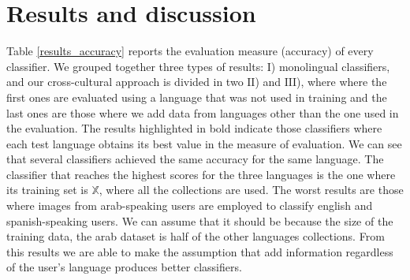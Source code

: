 \documentclass[runningheads]{llncs}
\begin{document}


\section{Results and discussion}\label{section:results}

Table \ref{results_accuracy} reports the evaluation measure (accuracy) 
of every classifier. We grouped together
three types of results: $\mathrm{I}$) monolingual classifiers,
and our cross-cultural approach is divided in two $\mathrm{II}$) and
$\mathrm{III}$), where where the first ones are evaluated using a language that was not used in training and the last ones are those where we add data from
languages other than the one used in the evaluation.
The results highlighted in bold indicate those classifiers where 
each test language obtains its best value in the measure of evaluation.
We can see that several classifiers achieved the same accuracy
for the same language. The classifier that reaches the highest scores 
for the three languages is the one where its training set is $\mathbb{X}$,
where all the collections are used.
The worst results are those where images from arab-speaking users
are employed to classify english and spanish-speaking users. We 
can assume that it should be because the size of the training data,
the arab dataset is half of the other languages collections.
From this results we are able to make the assumption that
add information regardless of the user's language produces better
classifiers.
\end{document}
